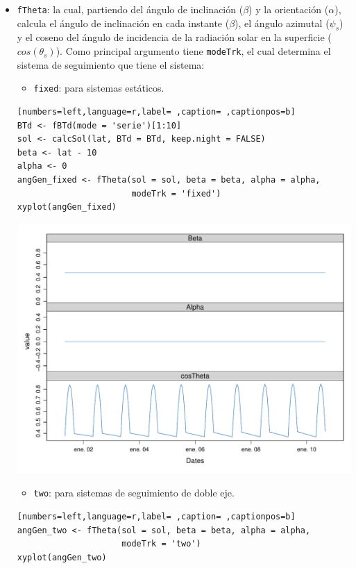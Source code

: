 \begin{itemize}
\item \texttt{fTheta}: la cual, partiendo del ángulo de inclinación (\(\beta\)) y la orientación (\(\alpha\)), calcula el ángulo de inclinación en cada instante (\(\beta\)), el ángulo azimutal (\(\psi_s\)) y el coseno del ángulo de incidencia  de la radiación solar en la superficie (\(cos(\theta_s)\)).
Como principal argumento tiene \texttt{modeTrk}, el cual determina el sistema de seguimiento que tiene el sistema:
\begin{itemize}
\item \texttt{fixed}: para sistemas estáticos.
\end{itemize}
\begin{lstlisting}[numbers=left,language=r,label= ,caption= ,captionpos=b]
BTd <- fBTd(mode = 'serie')[1:10]
sol <- calcSol(lat, BTd = BTd, keep.night = FALSE)
beta <- lat - 10
alpha <- 0
angGen_fixed <- fTheta(sol = sol, beta = beta, alpha = alpha,
                       modeTrk = 'fixed')
xyplot(angGen_fixed)
\end{lstlisting}

\begin{center}
\includegraphics[width=\textwidth]{figuras/codigo-fthetafixed.pdf}
\end{center}
\begin{itemize}
\item \texttt{two}: para sistemas de seguimiento de doble eje.
\end{itemize}
\begin{lstlisting}[numbers=left,language=r,label= ,caption= ,captionpos=b]
angGen_two <- fTheta(sol = sol, beta = beta, alpha = alpha,
                     modeTrk = 'two')
xyplot(angGen_two)
\end{lstlisting}


\end{itemize}

